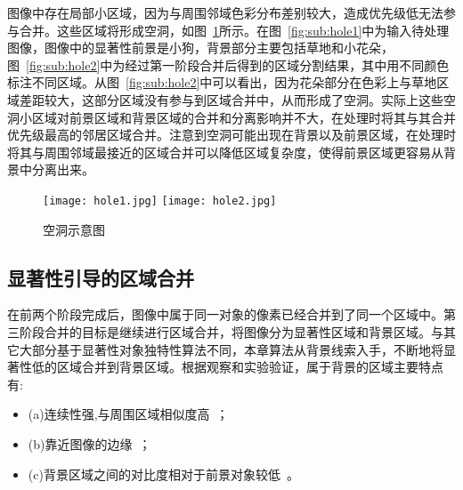 图像中存在局部小区域，因为与周围邻域色彩分布差别较大，造成优先级低无法参与合并。这些区域将形成空洞，如图~\ref{fig:hole}所示。在图~\ref{fig:sub:hole1}中为输入待处理图像，图像中的显著性前景是小狗，背景部分主要包括草地和小花朵，图~\ref{fig:sub:hole2}中为经过第一阶段合并后得到的区域分割结果，其中用不同颜色标注不同区域。从图~\ref{fig:sub:hole2}中可以看出，因为花朵部分在色彩上与草地区域差距较大，这部分区域没有参与到区域合并中，从而形成了空洞。实际上这些空洞小区域对前景区域和背景区域的合并和分离影响并不大，在处理时将其与其合并优先级最高的邻居区域合并。注意到空洞可能出现在背景以及前景区域，在处理时将其与周围邻域最接近的区域合并可以降低区域复杂度，使得前景区域更容易从背景中分离出来。
\begin{figure}[htb]
  \centering%
    {\texttt{[image: hole1.jpg]}}%
 \hspace{1em}%
      {\texttt{[image: hole2.jpg]}}

  \caption{空洞示意图}
  \label{fig:hole}
\end{figure}

\subsection{显著性引导的区域合并}
\label{subsec:mergeP3}

在前两个阶段完成后，图像中属于同一对象的像素已经合并到了同一个区域中。第三阶段合并的目标是继续进行区域合并，将图像分为显著性区域和背景区域。与其它大部分基于显著性对象独特性算法不同，本章算法从背景线索入手，不断地将显著性低的区域合并到背景区域。根据观察和实验验证，属于背景的区域主要特点有:
\begin{itemize}
\item (a)连续性强,与周围区域相似度高~\cite{geodesicDistance}；
\item (b)靠近图像的边缘~\cite{backgroundPrior}；
\item (c)背景区域之间的对比度相对于前景对象较低~\cite{geodesicDistance}。
\end{itemize}


